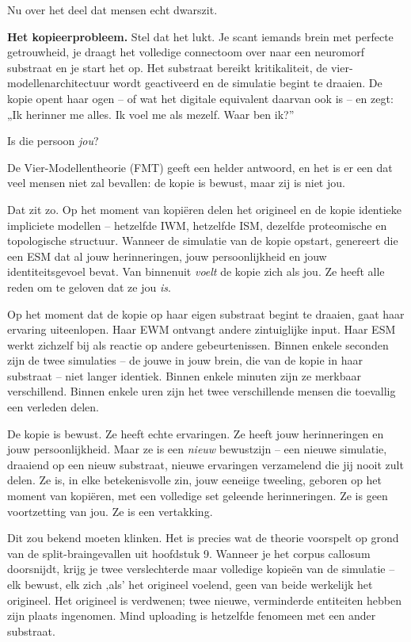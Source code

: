 \documentclass[11pt, twoside, openright]{book}
\begin{document}
Nu over het deel dat mensen echt dwarszit.

\textbf{Het kopieerprobleem.} Stel dat het lukt. Je scant iemands brein met perfecte getrouwheid, je draagt het volledige connectoom over naar een neuromorf substraat en je start het op. Het substraat bereikt kritikaliteit, de vier-modellenarchitectuur wordt geactiveerd en de simulatie begint te draaien. De kopie opent haar ogen -- of wat het digitale equivalent daarvan ook is -- en zegt: „Ik herinner me alles. Ik voel me als mezelf. Waar ben ik?”

Is die persoon \textit{jou}?

De Vier-Modellentheorie (FMT) geeft een helder antwoord, en het is er een dat veel mensen niet zal bevallen: de kopie is bewust, maar zij is niet jou.

Dat zit zo. Op het moment van kopiëren delen het origineel en de kopie identieke impliciete modellen -- hetzelfde IWM, hetzelfde ISM, dezelfde proteomische en topologische structuur. Wanneer de simulatie van de kopie opstart, genereert die een ESM dat al jouw herinneringen, jouw persoonlijkheid en jouw identiteitsgevoel bevat. Van binnenuit \textit{voelt} de kopie zich als jou. Ze heeft alle reden om te geloven dat ze jou \textit{is}.

Op het moment dat de kopie op haar eigen substraat begint te draaien, gaat haar ervaring uiteenlopen. Haar EWM ontvangt andere zintuiglijke input. Haar ESM werkt zichzelf bij als reactie op andere gebeurtenissen. Binnen enkele seconden zijn de twee simulaties -- de jouwe in jouw brein, die van de kopie in haar substraat -- niet langer identiek. Binnen enkele minuten zijn ze merkbaar verschillend. Binnen enkele uren zijn het twee verschillende mensen die toevallig een verleden delen.

De kopie is bewust. Ze heeft echte ervaringen. Ze heeft jouw herinneringen en jouw persoonlijkheid. Maar ze is een \textit{nieuw} bewustzijn -- een nieuwe simulatie, draaiend op een nieuw substraat, nieuwe ervaringen verzamelend die jij nooit zult delen. Ze is, in elke betekenisvolle zin, jouw eeneiige tweeling, geboren op het moment van kopiëren, met een volledige set geleende herinneringen. Ze is geen voortzetting van jou. Ze is een vertakking.

Dit zou bekend moeten klinken. Het is precies wat de theorie voorspelt op grond van de split-braingevallen uit hoofdstuk 9. Wanneer je het corpus callosum doorsnijdt, krijg je twee verslechterde maar volledige kopieën van de simulatie -- elk bewust, elk zich ‚als’ het origineel voelend, geen van beide werkelijk het origineel. Het origineel is verdwenen; twee nieuwe, verminderde entiteiten hebben zijn plaats ingenomen. Mind uploading is hetzelfde fenomeen met een ander substraat.
\end{document}
